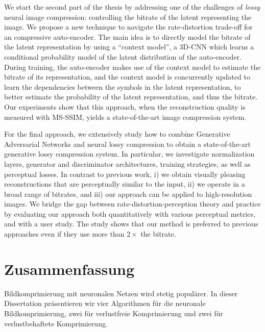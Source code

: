 We start the second part of the thesis by addressing one of the challenges of
\emph{lossy} neural image compression: controlling the bitrate of the latent
representing the image. We propose a new technique to
navigate the rate-distortion trade-off for an compressive auto-encoder.  The
main idea is to directly model the bitrate of the latent representation by
using a ``context model'', a 3D-CNN which learns a conditional probability
model of the latent distribution of the auto-encoder.  During training, the
auto-encoder makes use of the context model to estimate the bitrate of its
representation, and the context model is concurrently updated to learn the
dependencies between the symbols in the latent representation, to better
estimate the probability of the latent representation, and thus the bitrate.
Our experiments show that this approach, when the reconstruction quality is
measured with MS-SSIM, yields a state-of-the-art image compression system.

For the final approach, we extensively study how to combine Generative
Adversarial Networks and neural lossy compression to obtain a state-of-the-art
generative lossy compression system. In particular, we investigate
normalization layers, generator and discriminator architectures, training
strategies, as well as perceptual losses. In contrast to previous work, i) we
obtain visually pleasing reconstructions that are perceptually similar to the
input, ii) we operate in a broad range of bitrates, and iii) our approach can
be applied to high-resolution images. We bridge the gap between
rate-distortion-perception theory and practice by evaluating our approach both
quantitatively with various perceptual metrics, and with a user study. The
study shows that our method is preferred to previous approaches even if they
use more than $2{\times}$ the bitrate.

%
\vfill

\pagebreak


\chapter*{Zusammenfassung}

Bildkomprimierung mit neuronalen Netzen wird stetig populärer. In dieser
Dissertation präsentieren wir vier Algorithmen für die neuronale
Bildkomprimierung, zwei für verlustfreie Komprimierung und zwei für
verlustbehaftete Komprimierung.

